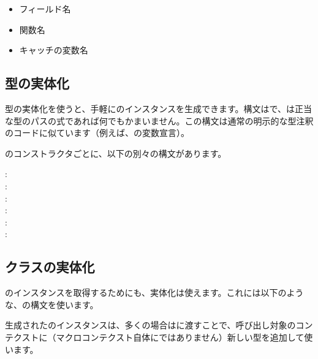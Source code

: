 \begin{itemize}
	\item フィールド名 
	\item 関数名 
	\item キャッチの変数名 
\end{itemize}

\subsection{型の実体化}
\label{macro-reification-type}

型の実体化を使うと、手軽にのインスタンスを生成できます。構文はで、は正当な型のパスの式であれば何でもかまいません。この構文は通常の明示的な型注釈のコードに似ています（例えば、の変数宣言）。

のコンストラクタごとに、以下の別々の構文があります。

\begin{description}
	\item[:] 
	\item[:] 
	\item[:] 
	\item[:] 
	\item[:] 
	\item[:] 
\end{description}

\subsection{クラスの実体化}
\label{macro-reification-class}

のインスタンスを取得するためにも、実体化は使えます。これには以下のような、の構文を使います。


生成されたのインスタンスは、多くの場合はに渡すことで、呼び出し対象のコンテクストに（マクロコンテクスト自体にではありません）新しい型を追加して使います。

